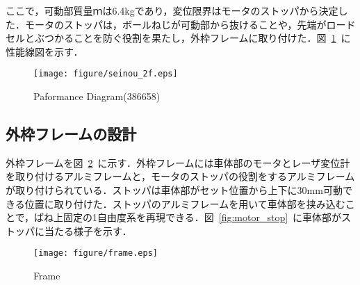 \documentclass[a4paper,12pt]{article_vdlab_sotsuron}
\begin{document}
\vspace*{10mm}
ここで，可動部質量ｍは6.4kgであり，変位限界はモータのストッパから決定した．モータのストッパは，ボールねじが可動部から抜けることや，先端がロードセルとぶつかることを防ぐ役割を果たし，外枠フレームに取り付けた．図~\ref{fig:seinou_2f}~に性能線図を示す．

\vspace*{10mm}
\begin{figure}[htp]
  \hspace*{45mm}
    \texttt{[image: figure/seinou\_2f.eps]}
    \vspace*{3mm}
    \caption{Paformance Diagram(386658)}
    \label{fig:seinou_2f}
\end{figure}

\newpage
\subsection{外枠フレームの設計}
外枠フレームを図~\ref{fig:frame}~に示す．外枠フレームには車体部のモータとレーザ変位計を取り付けるアルミフレームと，モータのストッパの役割をするアルミフレームが取り付けられている．ストッパは車体部がセット位置から上下に30mm可動できる位置に取り付けた．ストッパのアルミフレームを用いて車体部を挟み込むことで，ばね上固定の1自由度系を再現できる．図~\ref{fig:motor_stop}~に車体部がストッパに当たる様子を示す．

\vspace*{10mm}
\begin{figure}[htp]
  \begin{center}
    \texttt{[image: figure/frame.eps]}
    \vspace*{3mm}
    \caption{Frame}
    \label{fig:frame}
  \end{center}
\end{figure}
\end{document}
